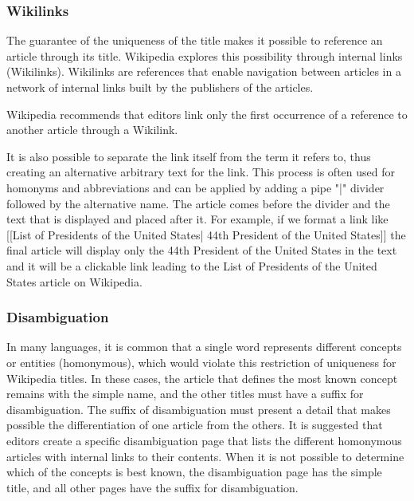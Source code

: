 \subsubsection{\hspace*{3pt}Wikilinks}

The guarantee of the uniqueness of the title makes it possible to reference an article through its title. Wikipedia explores this possibility through internal links (Wikilinks).   Wikilinks are references that enable navigation between articles in a network of internal links built by the publishers of the articles. 

Wikipedia recommends that editors link only the first occurrence of a reference to another article through a Wikilink. 

It is also possible to separate the link itself from the term it refers to, thus creating an alternative arbitrary text for the link. This process is often used for homonyms and abbreviations and can be applied by adding a pipe "|" divider followed by the alternative name. The article comes before the divider and the text that is displayed and placed after it.  For example, if we format a link like [[List of Presidents of the United States| 44th President of the United States]] the final article will display only the 44th President of the United States in the text and it will be a clickable link leading to the List of Presidents of the United States article on Wikipedia. 

\subsubsection{\hspace*{3pt}Disambiguation}

In many languages, it is common that a single word represents different concepts or entities (homonymous), which would violate this restriction of uniqueness for Wikipedia titles. In these cases, the article that defines the most known concept remains with the simple name, and the other titles must have a suffix for disambiguation. The suffix of disambiguation must present a detail that makes possible the differentiation of one article from the others. It is suggested that editors create a specific disambiguation page that lists the different homonymous articles with internal links to their contents. When it is not possible to determine which of the concepts is best known, the disambiguation page has the simple title, and all other pages have the suffix for disambiguation.


